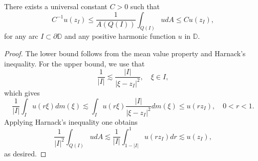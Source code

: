 \documentclass[10pt,a4paper]{amsart}
\begin{document}
\begin{lem}
    \label{meanvalue}
There exists a universal constant $C>0$ such that 
$$
C^{-1} u \left(z_{I}\right) \leqslant \frac{1}{A(Q(I))} \int_{Q(I)} u d A \leqslant C u\left(z_{I}\right), 
$$
for any arc $I \subset \partial \mathbb{D}$ and any positive harmonic function $u$ in $\mathbb{D}$. 
    
\end{lem}

\begin{proof}
 The lower bound follows 
from the mean value property and Harnack's inequality. 
For the upper bound, we use that
$$
\frac{1}{|I|} \lesssim  \frac{|I|}{\left|\xi-z_{I}\right|^{2}} , \quad  \xi \in I ,
$$
which gives
$$
\frac{1}{|I|} \int_{I} u(r \xi) dm (\xi) \lesssim \int_{I} u( r \xi) \frac{|I|}{\left|\xi-z_{I}\right|^{2}} d m(\xi) \leq u\left(r z_{I}\right), \quad  0<r<1 .
$$
Applying Harnack's inequality one obtains
$$
\frac{1}{|I|^{2}} \int_{Q(I)} u d A \lesssim \frac{1}{|I|} \int_{1-|I|}^{1} u\left(r z_{I}\right) d r \lesssim u\left(z_{I}\right), 
$$
as desired.
\end{proof}
\end{document}
